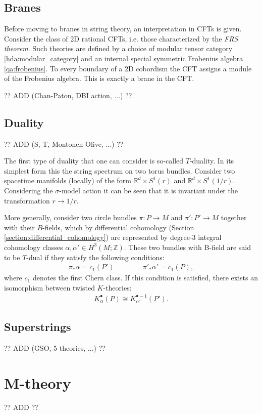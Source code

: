 \subsection{Branes}

    Before moving to branes in string theory, an interpretation in CFTs is given. Consider the class of 2D rational CFTs, i.e. those characterized by the \textit{FRS theorem}. Such theories are defined by a choice of modular tensor category \ref{hda:modular_category} and an internal special symmetric Frobenius algebra \ref{qa:frobenius}. To every boundary of a 2D cobordism the CFT assigns a module of the Frobenius algebra. This is exactly a brane in the CFT.

    ?? ADD (Chan-Paton, DBI action, ...) ??

\subsection{Duality}

    ?? ADD (S, T, Montonen-Olive, ...) ??

    The first type of duality that one can consider is so-called $T$-duality. In its simplest form this the string spectrum on two torus bundles. Consider two spacetime manifolds (locally) of the form $\mathbb{R}^d\times S^1(r)$ and $\mathbb{R}^d\times S^1(1/r)$. Considering the $\sigma$-model action it can be seen that it is invariant under the transformation $r\longrightarrow 1/r$.

    More generally, consider two circle bundles $\pi:P\rightarrow M$ and $\pi':P'\rightarrow M$ together with their $B$-fields, which by differential cohomology (Section \ref{section:differential_cohomology}) are represented by degree-3 integral cohomology classes $\alpha,\alpha'\in H^3(M;\mathbb{Z})$. These two bundles with B-field are said to be $T$-dual if they satisfy the following conditions:
    \begin{gather}
        \pi_*\alpha=c_1(P')\qquad\qquad\pi'_*\alpha'=c_1(P),
    \end{gather}
    where $c_1$ denotes the first Chern class. If this condition is satisfied, there exists an isomorphism between twisted $K$-theories:
    \begin{gather}
        K^\bullet_\alpha(P)\cong K^{\bullet-1}_{\alpha'}(P').
    \end{gather}

\subsection{Superstrings}

    ?? ADD (GSO, 5 theories, ...) ??

\section{M-theory}

    ?? ADD ??